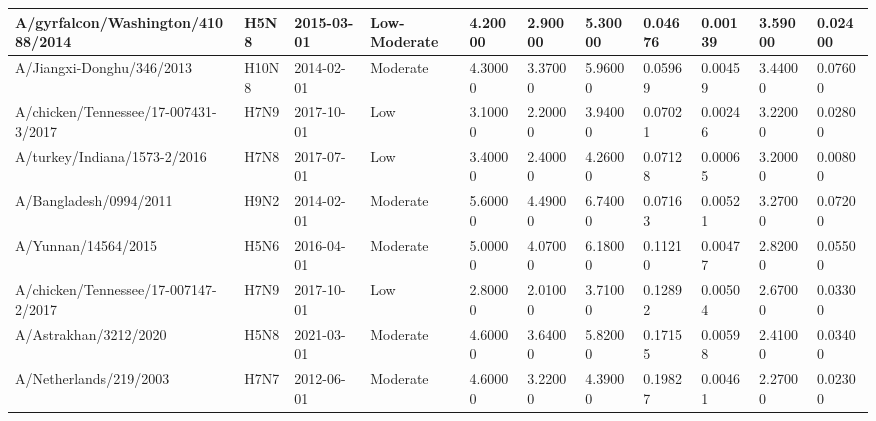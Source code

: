 \begin{tabular}{L{1in}|L{1in}|L{1in}|L{1in}|L{1in}|L{1in}|L{1in}|L{1in}|L{1in}|L{1in}|L{1in}}
 A/gyrfalcon/Washington/41088/2014 &H5N8&2015-03-01& Low-Moderate &4.20000&2.90000&5.30000&0.04676&0.00139&3.59000&0.02400\\\hline
 A/Jiangxi-Donghu/346/2013 &H10N8&2014-02-01& Moderate &4.30000&3.37000&5.96000&0.05969&0.00459&3.44000&0.07600\\\hline
 A/chicken/Tennessee/17-007431-3/2017 &H7N9&2017-10-01&Low&3.10000&2.20000&3.94000&0.07021&0.00246&3.22000&0.02800\\\hline
 A/turkey/Indiana/1573-2/2016 &H7N8&2017-07-01&Low&3.40000&2.40000&4.26000&0.07128&0.00065&3.20000&0.00800\\\hline
 A/Bangladesh/0994/2011 &H9N2&2014-02-01& Moderate &5.60000&4.49000&6.74000&0.07163&0.00521&3.27000&0.07200\\\hline
 A/Yunnan/14564/2015 &H5N6&2016-04-01& Moderate &5.00000&4.07000&6.18000&0.11210&0.00477&2.82000&0.05500\\\hline
 A/chicken/Tennessee/17-007147-2/2017 &H7N9&2017-10-01&Low&2.80000&2.01000&3.71000&0.12892&0.00504&2.67000&0.03300\\\hline
 A/Astrakhan/3212/2020 &H5N8&2021-03-01& Moderate &4.60000&3.64000&5.82000&0.17155&0.00598&2.41000&0.03400\\\hline
 A/Netherlands/219/2003 &H7N7&2012-06-01& Moderate &4.60000&3.22000&4.39000&0.19827&0.00461&2.27000&0.02300\\\hline
\hline\end{tabular}
